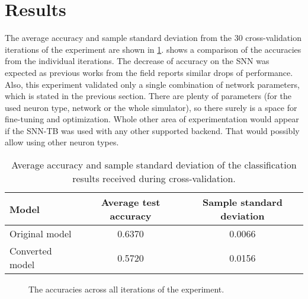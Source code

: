 
\section{Results}
The average accuracy and sample standard deviation from the 30 cross-validation iterations of the experiment are shown in \cref{tab:GTN_results}.  shows a comparison of the accuracies from the individual iterations. The decrease of accuracy on the SNN was expected as previous works from the field reports similar drops of performance. Also, this experiment validated only a single combination of network parameters, which is stated in the previous section. There are plenty of parameters (for the used neuron type, network or the whole simulator), so there surely is a space for fine-tuning and optimization. Whole other area of experimentation would appear if the SNN-TB was used with any other supported backend. That would possibly allow using other neuron types.

\begin{table}[htbp]
    \centering
    \begin{tabularx}{\linewidth}{>{\raggedright\arraybackslash}Xcc}
    \toprule
        Model & Average test accuracy & Sample standard deviation \\
    \midrule
        Original model & 0.6370 & 0.0066 \\
        Converted model & 0.5720 & 0.0156 \\
    \bottomrule
    \end{tabularx}
    \caption{Average accuracy and sample standard deviation of the classification results received during cross-validation.}
    \label{tab:GTN_results}
\end{table}

\begin{figure}[htbp]
    \centering
    
    \caption{The accuracies across all iterations of the experiment.}
    \label{fig:GTN_graph}
\end{figure}






